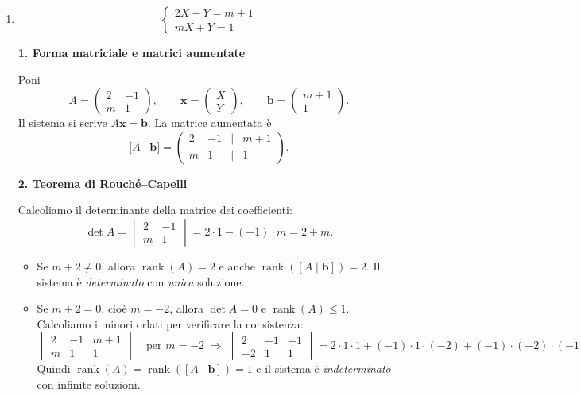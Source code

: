 \documentclass{article}
\theoremstyle{plain}
\theoremstyle{definition}
\theoremstyle{remark}
\begin{document}
\begin{enumerate}
    \item 
    \[
    \begin{cases}
        2X-Y=m+1\\
        mX+Y=1
    \end{cases}\]
    
\bigskip
\textbf{1. Forma matriciale e matrici aumentate}

Poni
\[
A = \begin{pmatrix}
2 & -1\\
m & 1
\end{pmatrix},
\qquad
\mathbf{x} = \begin{pmatrix}X\\Y\end{pmatrix},
\qquad
\mathbf{b} = \begin{pmatrix}m+1\\1\end{pmatrix}.
\]
Il sistema si scrive \(A\mathbf{x}=\mathbf{b}\). La matrice aumentata è
\[
\bigl[A\mid \mathbf{b}\bigr]
=
\begin{pmatrix}
2 & -1 & \mid & m+1\\
m & 1  & \mid & 1
\end{pmatrix}.
\]

\bigskip
\textbf{2. Teorema di Rouché–Capelli}

Calcoliamo il determinante della matrice dei coefficienti:
\[
\det A = 
\begin{vmatrix}
2 & -1\\
m & 1
\end{vmatrix}
= 2\cdot1 - (-1)\cdot m = 2 + m.
\]
\begin{itemize}
  \item Se \(m + 2 \neq 0\), allora \(\operatorname{rank}(A)=2\) e anche \(\operatorname{rank}([A\mid\mathbf b])=2\). Il sistema è \emph{determinato} con \emph{unica} soluzione.
  \item Se \(m + 2 = 0\), cioè \(m=-2\), allora \(\det A=0\) e \(\operatorname{rank}(A)\le1\). Calcoliamo i minori orlati per verificare la consistenza:
  \[
  \begin{vmatrix}
  2 & -1 & m+1\\
  m & 1  & 1
  \end{vmatrix}
  \quad\text{per }m=-2
  \;\Longrightarrow\;
  \begin{vmatrix}
  2 & -1 & -1\\
  -2 & 1 & 1
  \end{vmatrix}
  =2\cdot1\cdot1 +(-1)\cdot1\cdot(-2) +(-1)\cdot(-2)\cdot(-1)
  -\bigl((-1)\cdot1\cdot(-1) +2\cdot1\cdot(-1) +(-2)\cdot(-1)\cdot2\bigr)
  =0.
  \]
  Quindi \(\operatorname{rank}(A)=\operatorname{rank}([A\mid\mathbf b])=1\) e il sistema è \emph{indeterminato} con infinite soluzioni.
\end{itemize}


\end{enumerate}
\end{document}

